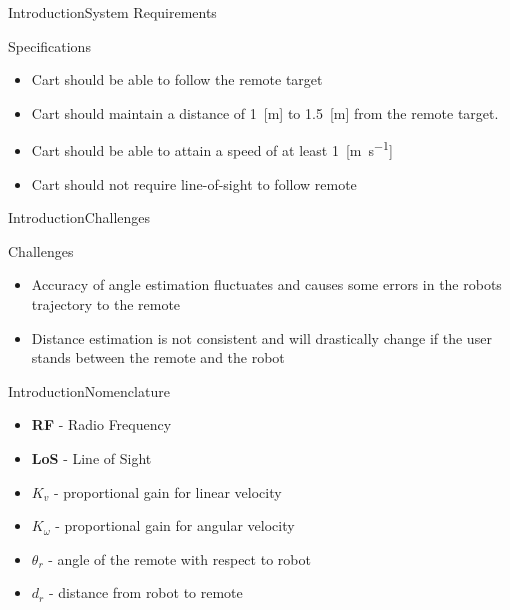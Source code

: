 \documentclass{beamer}
\begin{document}
\begin{frame}{Introduction}{System Requirements}
  \begin{block}{Specifications}
    \begin{itemize}
      \item Cart should be able to follow the remote target
      \item Cart should maintain a distance of 1~[\si{\meter}] to 1.5~[\si{\meter}] from the remote target.
      \item Cart should be able to attain a speed of at least 1~[\si{\meter\per\second}]
      \item Cart should not require line-of-sight to follow remote
     \end{itemize}
  \end{block}
\end{frame}


\begin{frame}{Introduction}{Challenges}
  \begin{block}{Challenges}
    \begin{itemize}
      \item Accuracy of angle estimation fluctuates and causes some errors in the robots trajectory to the remote
      \item Distance estimation is not consistent and will drastically change if the user stands between the remote and the robot
    \end{itemize}
  \end{block}
\end{frame}


\begin{frame}{Introduction}{Nomenclature}
    \begin{itemize}
      \item[]\textbf{RF} - Radio Frequency
      \item[]\textbf{LoS} - Line of Sight
    \end{itemize}
    \bigbreak
    
    \begin{itemize}
      \item[]$K_v$ - proportional gain for linear velocity
      \item[]$K_\omega$ - proportional gain for angular velocity
      \item[]$\theta_r$ - angle of the remote with respect to robot
      \item[]$d_r$ - distance from robot to remote
     \end{itemize}
\end{frame}
\end{document}
